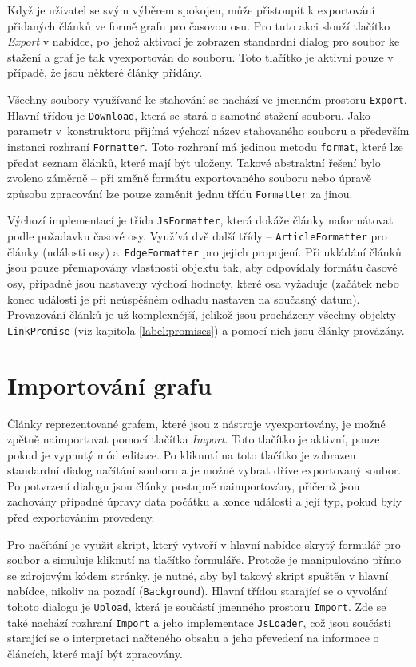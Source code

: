 Když je uživatel se svým výběrem spokojen, může přistoupit k exportování přidaných článků ve formě grafu pro časovou osu. Pro tuto akci slouží tlačítko \textit{Export} v nabídce, po~jehož aktivaci je zobrazen standardní dialog pro soubor ke stažení a graf je tak vyexportován do souboru. Toto tlačítko je aktivní pouze v případě, že jsou některé články přidány.

Všechny soubory využívané ke stahování se nachází ve jmenném prostoru \texttt{Export}. Hlavní třídou je \texttt{Download}, která se stará o samotné stažení souboru. Jako parametr v~konstruktoru přijímá výchozí název stahovaného souboru a především instanci rozhraní \texttt{For\-matter}. Toto rozhraní má jedinou metodu \texttt{format}, které lze předat seznam článků, které mají být uloženy. Takové abstraktní řešení bylo zvoleno záměrně -- při změně formátu exportovaného souboru nebo úpravě způsobu zpracování lze pouze zaměnit jednu třídu \texttt{Formatter} za jinou.

Výchozí implementací je třída \texttt{JsFormatter}, která dokáže články naformátovat podle požadavku časové osy. Využívá dvě další třídy -- \texttt{ArticleFormatter} pro články (události osy) a~\texttt{Edge\-For\-matter} pro jejich propojení. Při ukládání článků jsou pouze přemapovány vlastnosti objektu tak, aby odpovídaly formátu časové osy, případně jsou nastaveny výchozí hodnoty, které osa vyžaduje (začátek nebo konec události je při neúspěšném odhadu nastaven na současný datum). Provazování článků je už komplexnější, jelikož jsou procházeny všechny objekty \texttt{LinkPromise} (viz kapitola \ref{label:promises}) a pomocí nich jsou články provázány.

\section{Importování grafu}
Články reprezentované grafem, které jsou z nástroje vyexportovány, je možné zpětně naimportovat pomocí tlačítka \textit{Import}. Toto tlačítko je aktivní, pouze pokud je vypnutý mód editace. Po kliknutí na toto tlačítko je zobrazen standardní dialog načítání souboru a je možné vybrat dříve exportovaný soubor. Po potvrzení dialogu jsou články postupně naimportovány, přičemž jsou zachovány případné úpravy data počátku a konce události a její typ, pokud byly před exportováním provedeny.

Pro načítání je využit skript, který vytvoří v hlavní nabídce skrytý formulář pro soubor a simuluje kliknutí na tlačítko formuláře. Protože je manipulováno přímo se zdrojovým kódem stránky, je nutné, aby byl takový skript spuštěn v hlavní nabídce, nikoliv na pozadí (\texttt{Background}). Hlavní třídou starající se o vyvolání tohoto dialogu je \texttt{Upload}, která je součástí jmenného prostoru \texttt{Import}. Zde se také nachází rozhraní \texttt{Import} a jeho implementace \texttt{JsLoader}, což jsou součásti starající se o interpretaci načteného obsahu a jeho převedení na informace o článcích, které mají být zpracovány.

